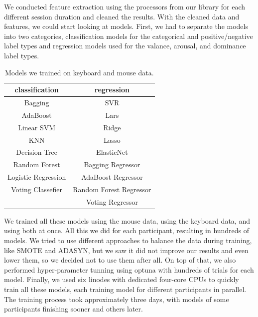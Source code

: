 \documentclass[../main.tex]{subfiles}
\begin{document}
    We conducted feature extraction using the processors from our library for each different session duration and cleaned the results. 
    With the cleaned data and features, we could start looking at models. First, we had to separate the models into two categories, 
    classification models for the categorical and positive/negative label types and regression models used for the valance, arousal, and dominance label types.

    \begin{table}[htp]
        \centering
        \begin{tabular}{cc}
            \toprule
            classification      & regression              \\ \midrule
            Bagging             & SVR                     \\
            AdaBoost            & Lars                    \\
            Linear SVM          & Ridge                   \\
            KNN                 & Lasso                   \\
            Decision Tree       & ElasticNet              \\
            Random Forest       & Bagging Regressor       \\
            Logistic Regression & AdaBoost Regressor      \\
            Voting Classefier   & Random Forest Regressor \\
                                & Voting Regressor        \\ \bottomrule
            \end{tabular}            
            \caption{Models we trained on keyboard and mouse data.}
            \label{table:classic_models}
    \end{table}

    We trained all these models using the mouse data, using the keyboard data, 
    and using both at once. All this we did for each participant, resulting in hundreds of models. We tried to use different approaches to balance 
    the data during training, like SMOTE and ADASYN, but we saw it did not improve our results and even lower them, so we decided not to use them after all.
    On top of that, we also performed hyper-parameter tunning using optuna \cite{optuna} with hundreds of trials for each model. 
    Finally, we used six linodes with dedicated four-core CPUs to quickly train all these models, each training model for different 
    participants in parallel. The training process took approximately three days, with models of some participants finishing sooner and others later.
\end{document}
